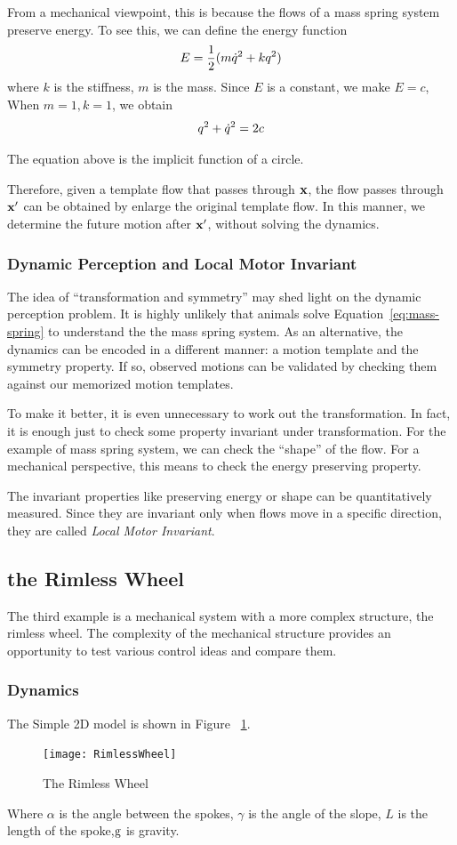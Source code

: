 From a mechanical viewpoint, this is because the flows of a mass spring system preserve energy.
To see this, we can define the energy function
\[
E=\frac{1}{2}(m\dot{q}^2+kq^2)
\]
where $k$ is the stiffness, $m$ is the mass.
Since $E$ is a constant, we make $E=c$,
When $m=1,k=1$, we obtain
\[
 q^2+\dot{q}^2=2c
\]
 
The equation above is the implicit function of a circle.

Therefore, given a template flow that passes through  $\mathbf{x}$, the flow passes through $\mathbf{x}'$  can be obtained by enlarge the original template flow.
In this manner, we determine the future motion after $\mathbf{x}'$, without solving the dynamics.


\subsubsection*{Dynamic Perception and Local Motor Invariant}

The idea of ``transformation and symmetry'' may shed light on the dynamic perception problem. 
It is highly unlikely that animals solve Equation~\ref{eq:mass-spring} to understand the the mass spring system.
As an alternative, the dynamics can be encoded in a different manner: a motion template and the symmetry property. 
If so, observed motions can be validated by checking them against our memorized motion templates.

To make it better, it is even unnecessary to work out the transformation.
In fact, it is enough just to check some property invariant under transformation.
For the example of mass spring system, we can check the ``shape'' of the flow.
For a mechanical perspective, this means to check the energy preserving property.

 
The invariant properties like preserving energy or shape can be quantitatively measured.
Since they are invariant only when flows move in a specific direction, they are called  \emph{Local Motor Invariant}. 


\subsection{the Rimless Wheel}
The third example is a mechanical system with a more complex structure, the rimless wheel.
The complexity of the mechanical structure provides an opportunity to test various control ideas and compare them.

\subsubsection*{Dynamics}
The Simple 2D model is shown in Figure ~\ref{fig:rimlesswheel}. 
\begin{figure}[!htbp]
  \begin{center}
     \texttt{[image: RimlessWheel]}
    \caption{The Rimless Wheel}
    \label{fig:rimlesswheel}  
  \end{center}
\end{figure}
Where $\alpha$ is the angle between the spokes,  $\gamma$ is the angle of the slope,
$L$ is the length of the spoke,$\mathrm{g}$ is gravity.

